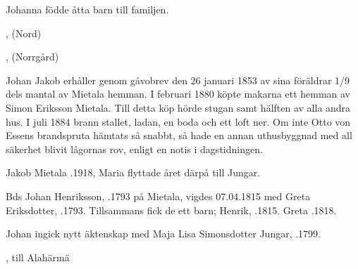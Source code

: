 Johanna födde åtta barn till familjen.
\begin{jhchildren}
  \item {}, (Nord)
  \item {}
  \item {}
  \item {}
  \item {}
  \item {}
  \item {}, (Norrgård)
  \item {}
\end{jhchildren}
Johan Jakob erhåller genom gåvobrev den 26 januari 1853 av sina föräldrar 1/9 dels mantal av Mietala hemman. I februari 1880 köpte makarna ett hemman av Simon Eriksson Mietala. Till detta köp hörde stugan samt hälften av alla andra hus. I juli 1884 brann stallet, ladan, en boda och ett loft ner. Om inte Otto von Essens brandspruta hämtats så snabbt, så hade en annan uthusbyggnad med all säkerhet blivit lågornas rov, enligt en notis i dagstidningen.

Jakob Mietala .1918, Maria flyttade året därpå till Jungar.


%
Bds Johan Henriksson, .1793 på Mietala, vigdes 07.04.1815 med Greta Eriksdotter, .1793. Tillsammans fick de ett barn; Henrik, .1815.
Greta .1818.

Johan ingick nytt äktenskap med Maja Lisa Simonsdotter Jungar, .1799.
\begin{jhchildren}
  \item {}
  \item {}
  \item {}
  \item {}
  \item {}
  \item {}, till Alahärmä
  \item {}
  \item {}
\end{jhchildren}

